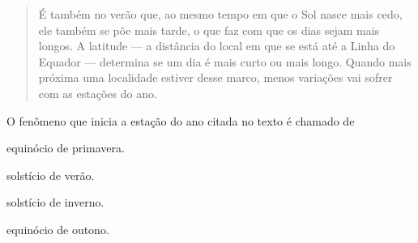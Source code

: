\begin{quote}
É também no verão que, ao mesmo tempo em que o Sol nasce mais cedo, ele
também se põe mais tarde, o que faz com que os dias sejam mais longos. A
latitude --- a distância do local em que se está até a Linha do Equador
--- determina se um dia é mais curto ou mais longo. Quando mais próxima
uma localidade estiver desse marco, menos variações vai sofrer com as
estações do ano.

\end{quote}

O fenômeno que inicia a estação do ano citada no texto é chamado de

\begin{minipage}{.5\textwidth}
\begin{escolha}
\item equinócio de primavera.

\item solstício de verão.

\item solstício de inverno.

\item equinócio de outono.
\end{escolha}
\end{minipage}




%
%
%
%
%
